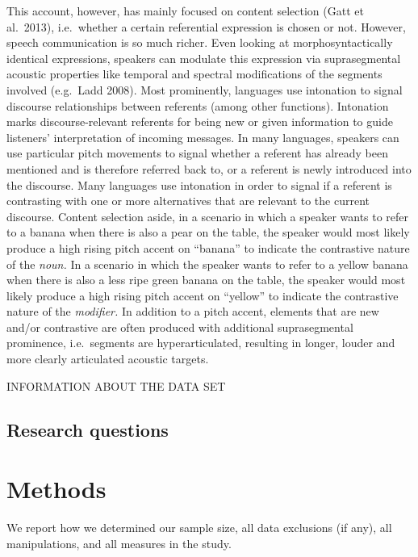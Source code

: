 \documentclass[
  english,
  man]{apa6}
\begin{document}
This account, however, has mainly focused on content selection (Gatt et al.~2013), i.e.~whether a certain referential expression is chosen or not. However, speech communication is so much richer. Even looking at morphosyntactically identical expressions, speakers can modulate this expression via suprasegmental acoustic properties like temporal and spectral modifications of the segments involved (e.g.~Ladd 2008). Most prominently, languages use intonation to signal discourse relationships between referents (among other functions). Intonation marks discourse-relevant referents for being new or given information to guide listeners' interpretation of incoming messages. In many languages, speakers can use particular pitch movements to signal whether a referent has already been mentioned and is therefore referred back to, or a referent is newly introduced into the discourse. Many languages use intonation in order to signal if a referent is contrasting with one or more alternatives that are relevant to the current discourse. Content selection aside, in a scenario in which a speaker wants to refer to a banana when there is also a pear on the table, the speaker would most likely produce a high rising pitch accent on \enquote{banana} to indicate the contrastive nature of the \emph{noun.} In a scenario in which the speaker wants to refer to a yellow banana when there is also a less ripe green banana on the table, the speaker would most likely produce a high rising pitch accent on \enquote{yellow} to indicate the contrastive nature of the \emph{modifier.} In addition to a pitch accent, elements that are new and/or contrastive are often produced with additional suprasegmental prominence, i.e.~segments are hyperarticulated, resulting in longer, louder and more clearly articulated acoustic targets.

INFORMATION ABOUT THE DATA SET

\hypertarget{research-questions}{%
\subsection{Research questions}\label{research-questions}}

\hypertarget{methods}{%
\section{Methods}\label{methods}}

We report how we determined our sample size, all data exclusions (if any), all manipulations, and all measures in the study.
\end{document}
